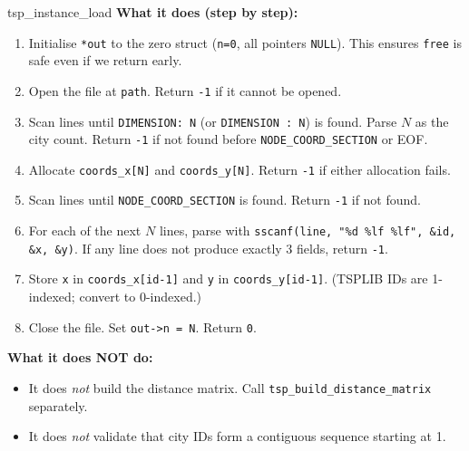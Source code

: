 \begin{apispec}{tsp\_instance\_load}
\textbf{What it does (step by step):}
\begin{enumerate}[label=\arabic*.]
  \item Initialise \texttt{*out} to the zero struct (\texttt{n=0}, all pointers \texttt{NULL}). This ensures \texttt{free} is safe even if we return early.
  \item Open the file at \texttt{path}. Return \texttt{-1} if it cannot be opened.
  \item Scan lines until \texttt{DIMENSION: N} (or \texttt{DIMENSION : N}) is found. Parse $N$ as the city count. Return \texttt{-1} if not found before \texttt{NODE\_COORD\_SECTION} or EOF.
  \item Allocate \texttt{coords\_x[N]} and \texttt{coords\_y[N]}. Return \texttt{-1} if either allocation fails.
  \item Scan lines until \texttt{NODE\_COORD\_SECTION} is found. Return \texttt{-1} if not found.
  \item For each of the next $N$ lines, parse with \texttt{sscanf(line, "\%d \%lf \%lf", \&id, \&x, \&y)}. If any line does not produce exactly 3 fields, return \texttt{-1}.
  \item Store \texttt{x} in \texttt{coords\_x[id-1]} and \texttt{y} in \texttt{coords\_y[id-1]}. (TSPLIB IDs are 1-indexed; convert to 0-indexed.)
  \item Close the file. Set \texttt{out->n = N}. Return \texttt{0}.
\end{enumerate}

\textbf{What it does NOT do:}
\begin{itemize}
  \item It does \emph{not} build the distance matrix. Call \texttt{tsp\_build\_distance\_matrix} separately.
  \item It does \emph{not} validate that city IDs form a contiguous sequence starting at 1.
\end{itemize}

\end{apispec}

\vspace{8pt}

